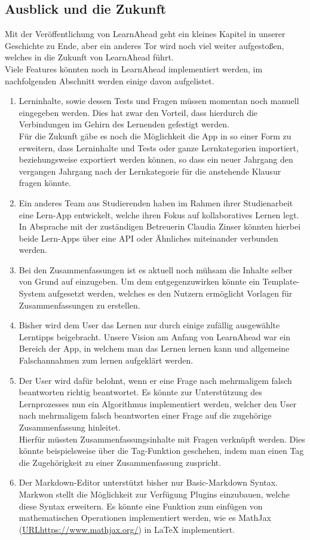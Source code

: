 \subsection{Ausblick und die Zukunft}
Mit der Veröffentlichung von LearnAhead geht ein kleines Kapitel in unserer Geschichte zu Ende, aber ein anderes Tor wird noch viel weiter aufgestoßen, welches in die Zukunft von LearnAhead führt.\\
Viele Features könnten noch in LearnAhead implementiert werden, im nachfolgenden Abschnitt werden einige davon aufgelistet.\\
\begin{enumerate}
    \item Lerninhalte, sowie dessen Tests und Fragen müssen momentan noch manuell eingegeben werden. Dies hat zwar den Vorteil, dass hierdurch die Verbindungen im Gehirn des Lernenden gefestigt werden.\\
    Für die Zukunft gäbe es noch die Möglichkeit die App in so einer Form zu erweitern, dass Lerninhalte und Tests oder ganze Lernkategorien importiert, beziehungsweise exportiert werden können, so dass ein neuer Jahrgang den vergangen Jahrgang nach der Lernkategorie für die anstehende Klausur fragen könnte.
    \item Ein anderes Team aus Studierenden haben im Rahmen ihrer Studienarbeit eine Lern-App entwickelt, welche ihren Fokus auf kollaboratives Lernen legt. In Absprache mit der zuständigen Betreuerin Claudia Zinser könnten hierbei beide Lern-Apps über eine API oder Ähnliches miteinander verbunden werden.
    \item Bei den Zusammenfassungen ist es aktuell noch mühsam die Inhalte selber von Grund auf einzugeben. Um dem entgegenzuwirken könnte ein Template-System aufgesetzt werden, welches es den Nutzern ermöglicht Vorlagen für Zusammenfassungen zu erstellen.
    \item Bisher wird dem User das Lernen nur durch einige zufällig ausgewählte Lerntipps beigebracht. Unsere Vision am Anfang von LearnAhead war ein Bereich der App, in welchem man das Lernen lernen kann und allgemeine Falschannahmen zum lernen aufgeklärt werden.
    \item Der User wird dafür belohnt, wenn er eine Frage nach mehrmaligem falsch beantworten richtig beantwortet. Es könnte zur Unterstützung des Lernprozesses nun ein Algorithmus implementiert werden, welcher den User nach mehrmaligem falsch beantworten einer Frage auf die zugehörige Zusammenfassung hinleitet.\\
    Hierfür müssten Zusammenfassungsinhalte mit Fragen verknüpft werden. Dies könnte beispielsweise über die Tag-Funktion geschehen, indem man einen Tag die Zugehörigkeit zu einer Zusammenfassung zuspricht.
    \item Der Markdown-Editor unterstützt bisher nur Basic-Markdown Syntax. Markwon stellt die Möglichkeit zur Verfügung Plugins einzubauen, welche diese Syntax erweitern. Es könnte eine Funktion zum einfügen von mathematischen Operationen implementiert werden, wie es MathJax (\href{URLhttps://www.mathjax.org/}{URLhttps://www.mathjax.org/}) in LaTeX implementiert.
\end{enumerate}
